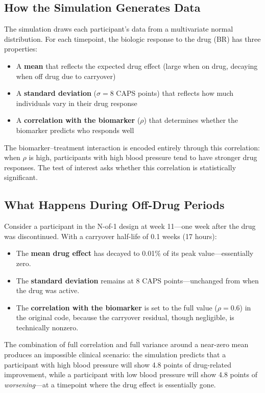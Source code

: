 \documentclass[11pt]{article}
\begin{document}
\subsection{How the Simulation Generates Data}

The simulation draws each participant's data from a
multivariate normal distribution. For each timepoint, the
biologic response to the drug (BR) has three properties:

\begin{itemize}
\item A \textbf{mean} that reflects the expected drug effect
  (large when on drug, decaying when off drug due to
  carryover)
\item A \textbf{standard deviation} ($\sigma = 8$ CAPS points)
  that reflects how much individuals vary in their drug
  response
\item A \textbf{correlation with the biomarker} ($\rho$) that
  determines whether the biomarker predicts who responds well
\end{itemize}

The biomarker--treatment interaction is encoded entirely
through this correlation: when $\rho$ is high, participants
with high blood pressure tend to have stronger drug responses.
The test of interest asks whether this correlation is
statistically significant.

\subsection{What Happens During Off-Drug Periods}

Consider a participant in the N-of-1 design at week 11---one
week after the drug was discontinued. With a carryover
half-life of 0.1 weeks (17 hours):

\begin{itemize}
\item The \textbf{mean drug effect} has decayed to 0.01\% of
  its peak value---essentially zero.
\item The \textbf{standard deviation} remains at 8 CAPS
  points---unchanged from when the drug was active.
\item The \textbf{correlation with the biomarker} is set to
  the full value ($\rho = 0.6$) in the original code, because
  the carryover residual, though negligible, is technically
  nonzero.
\end{itemize}

The combination of full correlation and full variance around a
near-zero mean produces an impossible clinical scenario: the
simulation predicts that a participant with high blood pressure
will show 4.8 points of drug-related improvement, while a
participant with low blood pressure will show 4.8 points of
\emph{worsening}---at a timepoint where the drug effect is
essentially gone.
\end{document}
